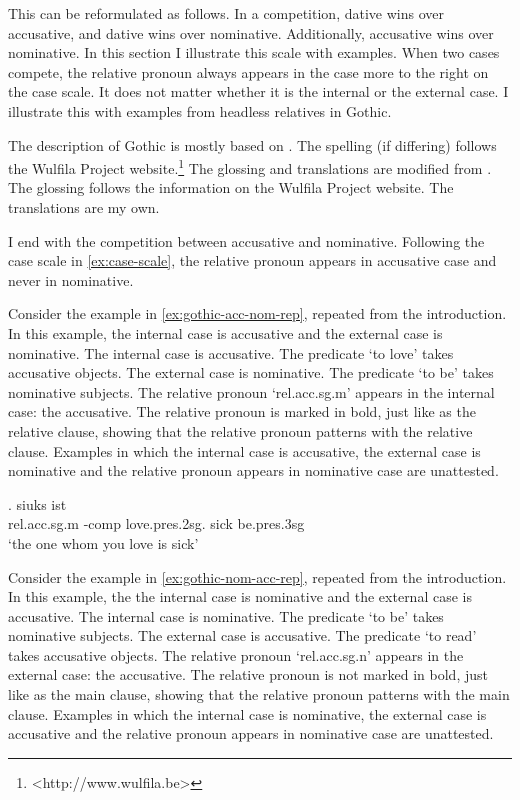 This can be reformulated as follows. In a competition, dative wins over accusative, and dative wins over nominative. Additionally, accusative wins over nominative. In this section I illustrate this scale with examples. When two cases compete, the relative pronoun always appears in the case more to the right on the case scale. It does not matter whether it is the internal or the external case. I illustrate this with examples from headless relatives in Gothic.

The description of Gothic is mostly based on \citep{harbert1978}. The spelling (if differing) follows the Wulfila Project website.\footnote{
<http://www.wulfila.be>
} The glossing and translations are modified from \citeauthor{harbert1978}. The glossing follows the information on the Wulfila Project website. The translations are my own.

I end with the competition between accusative and nominative. Following the case scale in \ref{ex:case-scale}, the relative pronoun appears in accusative case and never in nominative.

Consider the example in \ref{ex:gothic-acc-nom-rep}, repeated from the introduction. In this example, the internal case is accusative and the external case is nominative.
The internal case is accusative. The predicate  `to love' takes accusative objects.
The external case is nominative. The predicate  `to be' takes nominative subjects.
The relative pronoun  `\ac{rel}.\ac{acc}.\ac{sg}.\ac{m}' appears in the internal case: the accusative. The relative pronoun is marked in bold, just like as the relative clause, showing that the relative pronoun patterns with the relative clause.
Examples in which the internal case is accusative, the external case is nominative and the relative pronoun appears in nominative case are unattested.

\exg.    siuks ist\\
 \ac{rel}.\ac{acc}.\ac{sg}.\ac{m} -\ac{comp} love.\ac{pres}.2\ac{sg}.\scsub{[acc]} sick be.\ac{pres}.3\ac{sg}\scsub{[nom]}\\
 `the one whom you love is sick' \label{ex:gothic-acc-nom-rep}

Consider the example in \ref{ex:gothic-nom-acc-rep}, repeated from the introduction. In this example, the the internal case is nominative and the external case is accusative.
The internal case is nominative. The predicate  `to be' takes nominative subjects.
The external case is accusative. The predicate  `to read' takes accusative objects.
The relative pronoun  `\ac{rel}.\ac{acc}.\ac{sg}.\ac{n}' appears in the external case: the accusative. The relative pronoun is not marked in bold, just like as the main clause, showing that the relative pronoun patterns with the main clause.
Examples in which the internal case is nominative, the external case is accusative and the relative pronoun appears in nominative case are unattested.

